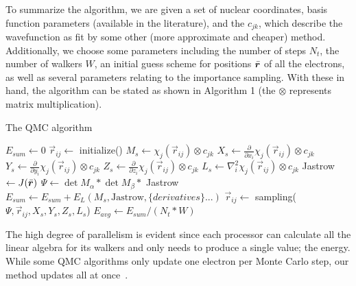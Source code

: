 \documentclass[11pt]{article}
\begin{document}
To summarize the algorithm, we are given a set of
nuclear coordinates, basis function parameters (available in the
literature), and the $c_{jk}$, which describe the wavefunction as fit
by some other (more approximate and cheaper) method. Additionally, we
choose some parameters including the number of steps $N_t$, the number
of walkers $W$, an initial guess scheme for positions $\bar{\bm r}$ of all
the electrons, as well as several parameters relating to the
importance sampling. With these in hand, the algorithm can be stated as
shown in Algorithm 1 (the $\otimes$ represents matrix multiplication).
\begin{algorithm}
\caption{The QMC algorithm} \label{qmcalg}
\begin{algorithmic}
\STATE $E_{sum} \leftarrow 0$
\STATE $\vec{r}_{ij} \leftarrow $ initialize()
\STATE $M_s \leftarrow \chi_{j} (\vec{r}_{ij}) \otimes c_{jk}$
\STATE $X_s \leftarrow \frac{\partial}{\partial x_{i}} \chi_{j} (\vec{r}_{ij}) \otimes c_{jk}$
\STATE $Y_s \leftarrow \frac{\partial}{\partial y_{i}} \chi_{j} (\vec{r}_{ij}) \otimes c_{jk}$
\STATE $Z_s \leftarrow \frac{\partial}{\partial z_{i}} \chi_{j} (\vec{r}_{ij}) \otimes c_{jk}$
\STATE $L_s \leftarrow \nabla^2_i \chi_{j} (\vec{r}_{ij}) \otimes c_{jk}$
\ENDFOR
\STATE Jastrow $\leftarrow J(\bar{\bm r})$
\STATE $\Psi \leftarrow \det M_\alpha * \det M_\beta * $ Jastrow
\STATE $E_{sum} \leftarrow E_{sum} + E_L(M_s, \text{Jastrow},\{\textit{derivatives}\}...)$
\STATE $\vec{r}_{ij} \leftarrow $ sampling($\Psi, \vec{r}_{ij}, X_s, Y_s, Z_s, L_s$)
\ENDFOR
\ENDFOR
\STATE $E_{avg} \leftarrow E_{sum}/(N_t * W)$
\end{algorithmic}
\end{algorithm}
The high degree of parallelism is evident since each processor can
calculate all the linear algebra for its walkers and only needs to
produce a single value; the energy. While some QMC algorithms only
update one electron per Monte Carlo step, our method updates
all at once~\cite{UmrigarNightingaleRunge1993}.
\end{document}
